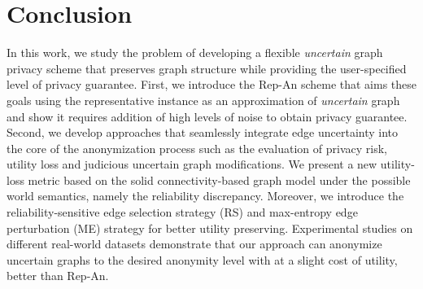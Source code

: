 \section{Conclusion}
In this work, we study the problem of developing a flexible \emph{uncertain} graph privacy scheme that preserves graph structure while providing the user-specified level of privacy guarantee. First, we introduce the Rep-An scheme that aims these goals using the representative instance as an approximation of \emph{uncertain} graph and show it requires addition of high levels of noise to obtain privacy guarantee. 
Second, we develop {\SysNameNS} approaches that seamlessly integrate edge uncertainty into the core of the
anonymization process such as the evaluation of privacy risk, utility loss and judicious uncertain graph modifications. 
We present a new utility-loss metric based on the solid connectivity-based graph model under the possible world semantics, namely the reliability discrepancy. Moreover, we introduce the reliability-sensitive edge selection strategy (RS) and max-entropy edge perturbation (ME) strategy for better utility preserving. 
Experimental studies on different real-world datasets demonstrate that our approach can anonymize uncertain graphs to the desired anonymity level with at a slight cost of utility, better than {Rep-An}. 